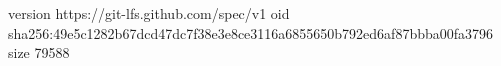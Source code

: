 version https://git-lfs.github.com/spec/v1
oid sha256:49e5c1282b67dcd47dc7f38e3e8ce3116a6855650b792ed6af87bbba00fa3796
size 79588
